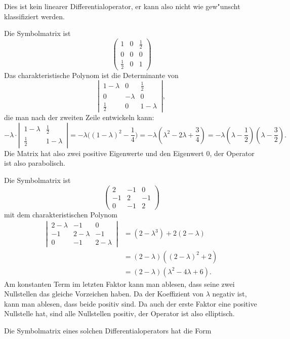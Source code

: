 \begin{loesung}
\begin{teilaufgaben}
\item Dies ist kein linearer Differentialoperator, er kann also nicht
wie gew"unscht klassifiziert werden.
\item Die Symbolmatrix ist
\[
\begin{pmatrix}
1&0&\frac12\\
0&0&0\\
\frac12&0&1
\end{pmatrix}
\]
Das charakteristische Polynom ist die Determinante von
\[
\left|\,\begin{matrix}
1-\lambda&0&\frac12\\
0&-\lambda&0\\
\frac12&0&1-\lambda
\end{matrix}
\,\right|,
\]
die man nach der zweiten Zeile entwickeln kann:
\[
-\lambda\cdot\left|\,
\begin{matrix}1-\lambda&\frac12\\\frac12&1-\lambda\end{matrix}
\,\right|
=
-\lambda\biggl((1-\lambda)^2-\frac14\biggr)
=
-\lambda\left(\lambda^2-2\lambda+\frac34\right)
=
-\lambda(\lambda-\frac12)(\lambda-\frac32).
\]
Die Matrix hat also zwei positive Eigenwerte und den Eigenwert $0$,
der Operator ist also parabolisch.
\item Die Symbolmatrix ist
\[
\begin{pmatrix}
2&-1&0\\
-1&2&-1\\
0&-1&2
\end{pmatrix}
\]
mit dem charakteristischen Polynom
\begin{align*}
\left|\,
\begin{matrix}
2-\lambda&-1&0\\
-1&2-\lambda&-1\\
0&-1&2-\lambda
\end{matrix}\,\right|
&=(2-\lambda^3)+2(2-\lambda)
\\
&=(2-\lambda)((2-\lambda)^2+2)
\\
&=(2-\lambda)(\lambda^2-4\lambda+6).
\end{align*}
Am konstanten Term im letzten Faktor kann man ablesen, dass
seine zwei Nullstellen das gleiche Vorzeichen haben. Da der
Koeffizient von $\lambda$ negativ ist, kann man ablesen, dass
beide positiv sind. Da auch der erste Faktor eine positive
Nullstelle hat, sind alle Nullstellen positiv, der Operator ist
also elliptisch.
\item Die Symbolmatrix eines solchen Differentialoperators hat die Form

\end{teilaufgaben}
\end{loesung}
